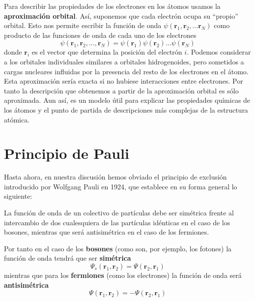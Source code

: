 \documentclass{tufte-handout}
\begin{document}
Para describir las propiedades de los electrones en los átomos
usamos la \textbf{aproximación orbital}. Así, suponemos que cada
electrón ocupa su “propio” orbital. Esto nos permite escribir la
función de onda 
$\psi(\mathbf{r}_1,\mathbf{r}_2,...\mathbf{r}_N)$
como producto de las funciones de onda de cada uno de
los electrones
\begin{equation}
    \psi(\mathbf{r}_1, \mathbf{r}_2, ..., \mathbf{r}_N) = \psi(\mathbf{r}_1)\psi(\mathbf{r}_2)...\psi(\mathbf{r}_ N)
\end{equation}
donde $\mathbf{r}_i$ es el vector que determina la posición 
del electrón $i$. Podemos considerar a los orbitales individuales
similares a orbitales hidrogenoides, pero sometidos a cargas
nucleares influidas por la presencia del resto de los electrones
en el átomo. Esta aproximación sería exacta si no hubiese
interacciones entre electrones. Por tanto la descripción 
que obtenemos a partir de la aproximación orbital es sólo
aproximada. Aun así, es un modelo útil para explicar
las propiedades químicas de los átomos y el punto de partida de 
descripciones más complejas de la estructura atómica. 

\section{Principio de Pauli}
Hasta ahora, en nuestra discusión hemos obviado el principio de 
exclusión introducido por Wolfgang Pauli en 1924, que
establece en su forma general lo siguiente: 
\begin{displayquote}
La función de onda de un colectivo de partículas 
debe ser simétrica frente al intercambio de dos cualesquiera de las partículas
idénticas en el caso de los bosones, mientras que
será antisimétrica en el caso de los fermiones.
\end{displayquote}
Por tanto en el caso de los \textbf{bosones} (como son, por ejemplo,
los fotones) la función de onda tendrá que ser
\textbf{simétrica}
\begin{equation}
    \Psi_s(\mathbf{r}_1,\mathbf{r}_2)=\Psi(\mathbf{r}_2,\mathbf{r}_1)
\end{equation}
mientras que para los \textbf{fermiones} (como los electrones)
la función de onda será \textbf{antisimétrica}
\begin{equation}
    \Psi(\mathbf{r}_1,\mathbf{r}_2)=-\Psi(\mathbf{r}_2,\mathbf{r}_1)
\end{equation}
\end{document}
